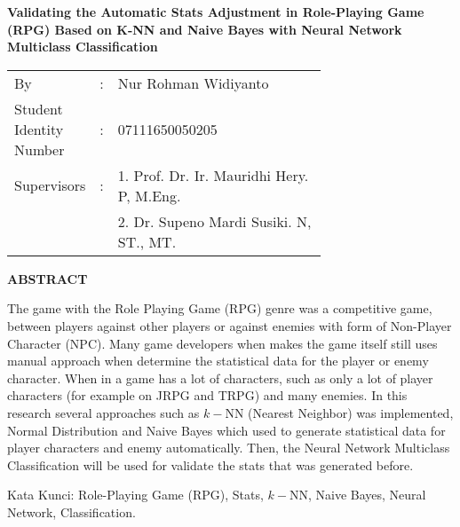 \begin{spacing}{1}
	\begin{center}
		\Large\textbf{Validating the Automatic Stats Adjustment in Role-Playing Game (RPG) Based on K-NN and Naive Bayes with Neural Network Multiclass Classification}
	\end{center}
	\vspace{2ex}
	
	\begin{adjustwidth}{-0.2cm}{}
		\begin{tabular}{lcp{0.7\linewidth}}
			By &:& Nur Rohman Widiyanto \\
			Student Identity Number &:&	07111650050205 \\
			Supervisors &:& 1. Prof. Dr. Ir. Mauridhi Hery. P, M.Eng. \\
			& & 2. Dr. Supeno Mardi Susiki. N, ST., MT. \\
		\end{tabular}
	\end{adjustwidth}
	\vspace{2ex}
	
	\begin{center}
		\Large\textbf{ABSTRACT}
	\end{center}
	\vspace{1ex}
	
	The game with the Role Playing Game (RPG) genre was a competitive game, between players against other players or against enemies with form of Non-Player Character (NPC). Many game developers when makes the game itself still uses manual approach when determine the statistical data for the player or enemy character. When in a game has a lot of characters, such as only a lot of player characters (for example on JRPG and TRPG) and many enemies. In this research several approaches such as $k-$NN (Nearest Neighbor) was implemented, Normal Distribution and Naive Bayes which used to generate statistical data for player characters and enemy automatically. Then, the Neural Network Multiclass Classification will be used for validate the stats that was generated before.
	\vspace{2ex}

	Kata Kunci: Role-Playing Game (RPG), Stats, $k-$NN, Naive Bayes, Neural Network, Classification.
\end{spacing}